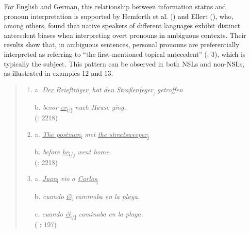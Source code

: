 \documentclass[
  letterpaper,
  DIV=11,
  numbers=noendperiod]{scrartcl}
\begin{document}
For English and German, this relationship between information status and
pronoun interpretation is supported by Hemforth et al.
() and Ellert
(), who, among others, found that native
speakers of different languages exhibit distinct antecedent biases when
interpreting overt pronouns in ambiguous contexts. Their results show
that, in ambiguous sentences, personal pronouns are preferentially
interpreted as referring to ``the first-mentioned topical antecedent''
(: 3), which is typically the
subject. This pattern can be observed in both NSLs and non-NSLs, as
illustrated in examples 12 and 13.

\begin{quote}
\begin{enumerate}
\def\labelenumi{(\arabic{enumi})}
\setcounter{enumi}{11}
\item
  a. \ul{\emph{Der Briefträger}\textsubscript{i}} \emph{hat \ul{den
  Straßenfeger}}\textsubscript{\ul{j}} \emph{getroffen}

  b. \emph{bevor \ul{er}}\textsubscript{i/j} \emph{nach Hause ging.}\\
  (: 2218)
\item
  a. \ul{\emph{The postman}\textsubscript{i}} \emph{met \ul{the
  streetsweeper}}\textsubscript{\ul{j}}

  b. \emph{before \ul{he}}\textsubscript{i/j} \emph{went home.}\\
  (: 2218)
\item
  a. \ul{\emph{Juan}}\textsubscript{i} \emph{vio a
  \ul{Carlos}}\textsubscript{\ul{j}}

  b. \emph{cuando \ul{Ø}}\textsubscript{i} \emph{caminaba en la playa.}

  c. \emph{cuando \ul{él}}\textsubscript{i/j} \emph{caminaba en la
  playa.}\\
  ( : 197)
\end{enumerate}
\end{quote}
\end{document}
